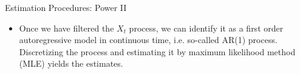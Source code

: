 {Estimation Procedures: Power II}
\begin{itemize}
\item Once we have filtered the $X_t$ process, we can identify it as a first order autoregressive model in continuous time, i.e. so-called AR(1) process. Discretizing the process and estimating it by maximum likelihood method (MLE) yields the estimates.
\end{itemize}



